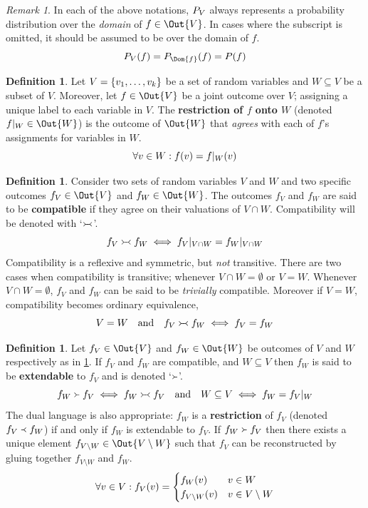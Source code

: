 \documentclass[aps, 10pt, english, twoside, pra, nofootinbib, longbibliography]{revtex4-1}
\theoremstyle{plain}
\theoremstyle{definition}
\newtheorem{definition}[theorem]{Definition}
\theoremstyle{remark}
\newtheorem{remark}[theorem]{Remark}
\newcommand{\com}{\mathrel{\Yright\hspace{-0.2em}\Yleft}}
\newcommand{\ext}{\mathrel{\Yright}}
\newcommand{\res}{\mathrel{\Yleft}}
\newcommand{\term}[1]{\textcolor{Mahogany}{\textbf{#1}}}
\begin{document}
    \begin{remark}
        \label{rem:domain_dist}
        In each of the above notations, $\prob[V]$ always represents a probability distribution over the \textit{domain} of $f \in \Out{V}$. In cases where the subscript is omitted, it should be assumed to be over the domain of $f$.
        \[ \prob[V][f] = \prob[\Dom{f}][f] = \prob[][f] \]
    \end{remark}

    \begin{definition}
        \label{def:restriction}
        Let $V = \bc{v_1, \ldots, v_k}$ be a set of random variables and $W \subseteq V$ be a subset of $V$. Moreover, let $f \in \Out{V}$ be a joint outcome over $V$; assigning a unique label to each variable in $V$. The \term{restriction of $f$ onto $W$} (denoted $f|_{W} \in \Out{W}$) is the outcome of $\Out{W}$ that \textit{agrees} with each of $f$'s assignments for variables in $W$.
        \[ \forall v \in W : f\br{v} = f|_{W}\br{v} \]
    \end{definition}

    \begin{definition}
        \label{def:outcome_compatible}
        Consider two sets of random variables $V$ and $W$ and two specific outcomes $f_V \in \Out{V}$ and $f_W \in \Out{W}$. The outcomes $f_V$ and $f_W$ are said to be \term{compatible} if they agree on their valuations of $V \cap W$. Compatibility will be denoted with `$\com$'.
        \[ f_V \com f_W \iff {f_V}|_{V\cap W} = {f_W}|_{V\cap W} \]
        Compatibility is a reflexive and symmetric, but \textit{not} transitive. There are two cases when compatibility is transitive; whenever $V \cap W = \emptyset$ or $V = W$. Whenever $V \cap W = \emptyset$, $f_V$ and $f_W$ can be said to be \textit{trivially} compatible. Moreover if $V = W$, compatibility becomes ordinary equivalence,
        \[ V = W \quad \textrm{and} \quad f_V \com f_W \iff f_V = f_W \]
    \end{definition}

    \begin{definition}
        \label{def:extendable}
        Let $f_V \in \Out{V}$ and $f_W \in \Out{W}$ be outcomes of $V$ and $W$ respectively as in \cref{def:outcome_compatible}. If $f_V$ and $f_W$ are compatible, and $W \subseteq V$ then $f_W$ is said to be \term{extendable} to $f_V$ and is denoted `$\ext$'.
        \[ f_W \ext f_V \iff f_W \com f_V \quad \textrm{and} \quad W \subseteq V \iff {f_W} = {f_V}|_{W} \]
        The dual language is also appropriate: $f_W$ is a \term{restriction} of $f_V$ (denoted $f_V \res f_W$) if and only if $f_W$ is extendable to $f_V$. If $f_W \ext f_V$ then there exists a unique element $f_{V \setminus W} \in \Out{V \setminus W}$ such that $f_V$ can be reconstructed by gluing together $f_{V \setminus W}$ and $f_W$.
        \[ \forall v \in V : f_V\br{v} = \begin{cases}
            f_W\br{v} & v \in W \\
            f_{V\setminus W}\br{v} & v \in V \setminus W
        \end{cases}  \]
    \end{definition}
\end{document}
